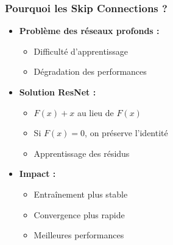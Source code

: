 \documentclass{beamer}
\begin{document}
\begin{frame}
    \frametitle{Pourquoi les Skip Connections ?}
    \begin{itemize}
        \item \textbf{Problème des réseaux profonds :}
        \begin{itemize}
            \item Difficulté d'apprentissage
            \item Dégradation des performances
        \end{itemize}
        \item \textbf{Solution ResNet :}
        \begin{itemize}
            \item \(F(x) + x\) au lieu de \(F(x)\)
            \item Si \(F(x) = 0\), on préserve l'identité
            \item Apprentissage des résidus
        \end{itemize}
        \item \textbf{Impact :}
        \begin{itemize}
            \item Entraînement plus stable
            \item Convergence plus rapide
            \item Meilleures performances
        \end{itemize}
    \end{itemize}
\end{frame}
\end{document}
